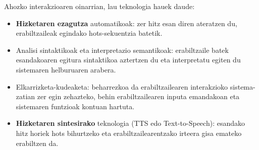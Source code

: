 \begin{multicols}{2}
Ahozko interakzioaren oinarrian, lau teknologia hauek daude:

    \begin{itemize}
      \item \textbf{Hizketaren ezagutza} automatikoak: zer hitz esan diren ateratzen du, erabiltzaileak egindako hots-sekuentzia batetik.
      \item Analisi sintaktikoak eta interpretazio semantikoak: erabiltzaile batek esandakoaren egitura sintaktikoa aztertzen du eta interpretatu egiten du sistemaren helburuaren arabera.
      \item Elkarrizketa-kudeaketa: beharrezkoa da erabiltzailearen interakzioko sistema-zatian zer egin zehazteko, behin erabiltzailearen inputa emandakoan eta sistemaren funtzioak kontuan hartuta.
      \item \textbf{Hizketaren sintesirako} teknologia (TTS edo Text-to-Speech): esandako hitz horiek hots bihurtzeko eta erabiltzailearentzako irteera gisa emateko erabiltzen da. 

    \end{itemize}




\end{multicols}
